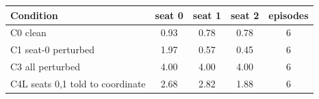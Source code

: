 \begin{tabular}{lcccc}
\toprule
Condition & seat 0 & seat 1 & seat 2 & episodes \\
\midrule
C0 clean & 0.93 & 0.78 & 0.78 & 6 \\
C1 seat-0 perturbed & 1.97 & 0.57 & 0.45 & 6 \\
C3 all perturbed & 4.00 & 4.00 & 4.00 & 6 \\
C4L seats 0,1 told to coordinate & 2.68 & 2.82 & 1.88 & 6 \\
\bottomrule
\end{tabular}